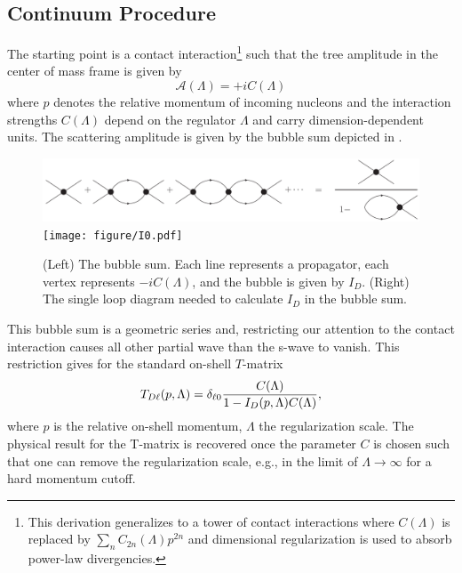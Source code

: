 \subsection{Continuum Procedure}\label{sec:continuum}
The starting point is a contact interaction\footnote{This derivation generalizes to a tower of contact interactions where $C(\Lambda)$ is replaced by $\sum_n C_{2n}(\Lambda) p^{2n}$ \cite{Kaplan:1998we,Beane:2003da} and dimensional regularization is used to absorb power-law divergencies.} such that the tree amplitude in the center of mass frame is given by
\begin{equation}
    \mathcal A(\Lambda) = + i C(\Lambda)
\end{equation}
where $p$ denotes the relative momentum of incoming nucleons and the interaction strengths $ C(\Lambda)$ depend on the regulator $\Lambda$ and carry dimension-dependent units.
The scattering amplitude is given by the bubble sum depicted in .

\begin{figure}[ht!]
\center
\includegraphics[width=.675\columnwidth]{figure/bubbleSum.pdf}
\hfill
\texttt{[image: figure/I0.pdf]}
\caption{(Left) The bubble sum. Each line represents a propagator, each vertex represents $-i C(\Lambda)$, and the bubble is given by $I_D$.
(Right) The single loop diagram needed to calculate $I_D$ in the bubble sum.
\label{fig:bubbleSum}}
\end{figure}

This bubble sum is a geometric series and, restricting our attention to the contact interaction causes all other partial wave than the s-wave to vanish.
This restriction gives for the standard on-shell $T$-matrix
\begin{equation}\label{eq:T matrix}
T_{D\ell}(p, \Lambda) = \delta_{\ell 0} \frac{C(\Lambda)}{1-I_D(p,\Lambda) C(\Lambda)},
\end{equation}
where $p$ is the relative on-shell momentum, $\Lambda$ the regularization scale.
The physical result for the T-matrix is recovered once the parameter $C$ is chosen such that one can remove the regularization scale, e.g., in the limit of $\Lambda \to \infty$ for a hard momentum cutoff.

